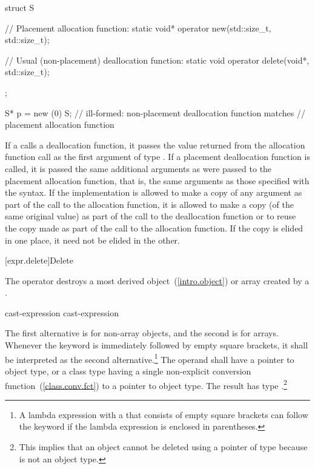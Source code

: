\begin{codeblock}
struct S { 
  // Placement allocation function:
  static void* operator new(std::size_t, std::size_t); 

  // Usual (non-placement) deallocation function:
  static void operator delete(void*, std::size_t); 
}; 

S* p = new (0) S;   // ill-formed: non-placement deallocation function matches 
                    // placement allocation function 
\end{codeblock}

\exitexample

\pnum
If a  calls a deallocation function, it passes
the value returned from the allocation function call as the first
argument of type . If a placement deallocation function is
called, it is passed the same additional arguments as were passed to the
placement allocation function, that is, the same arguments as those
specified with the  syntax. If the
implementation is allowed to make a copy of any argument as part of the
call to the allocation function, it is allowed to make a copy (of the
same original value) as part of the call to the deallocation function or
to reuse the copy made as part of the call to the allocation function.
If the copy is elided in one place, it need not be elided in the other.

[expr.delete]{Delete}

\pnum
{}%
%
The  operator destroys a most derived
object~(\ref{intro.object}) or array created by a
.

\begin{bnf}
\br
    \terminal{::}\opt {} cast-expression\br
    \terminal{::}\opt {} cast-expression
\end{bnf}

The first alternative is for non-array objects, and the second is for arrays. Whenever
the  keyword is immediately followed by empty square brackets, it shall be
interpreted as the second alternative.\footnote{A lambda expression with a
 that consists of
empty square brackets can follow the  keyword if the lambda expression is
enclosed in parentheses.}
The operand shall have a pointer to object type, or a class type having a single
non-explicit conversion function~(\ref{class.conv.fct}) to a pointer to object
type. The result has type .\footnote{This implies that an object
cannot be deleted using a pointer of type
 because  is not an object type.}

